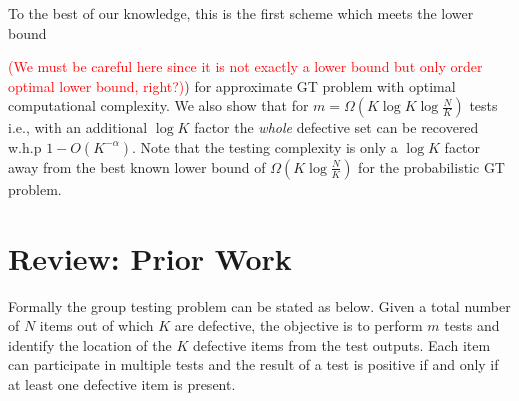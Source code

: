 \documentclass[conference,twocolumn]{IEEEtran}
\begin{document}
To the best of our knowledge, this is the first scheme which meets the lower bound {\textcolor{red}{(We must be careful here since it is not exactly a lower bound but only order optimal lower bound, right?)}) for approximate GT problem with optimal computational complexity. We also show that for $m=\Omega( K\log K \log \frac{N}{K})$ tests  i.e., with an additional $\log K$ factor the \textit{whole} defective set can be recovered w.h.p $1-O(K^{-\alpha})$. Note that the testing complexity is only a $\log K$ factor away from the best known lower bound of $\Omega(K\log \frac{N}{K})$ \cite{chan2014non} for the probabilistic GT problem.


\section{Review: Prior Work}
\label{Sec:PriorWork}
Formally the group testing problem can be stated as below. Given a total number of $N$ items out of which $K$ are defective, the objective is to perform $m$ tests and identify the location of the $K$ defective items from the test outputs. Each item can participate in multiple tests and the result of a test is positive if and only if at least one defective item is present.

}
\end{document}
